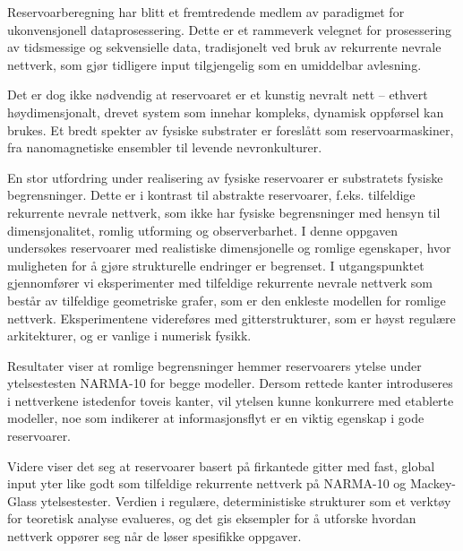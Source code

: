 Reservoarberegning har blitt et fremtredende medlem av paradigmet for
ukonvensjonell dataprosessering. Dette er et rammeverk velegnet for prosessering
av tidsmessige og sekvensielle data, tradisjonelt ved bruk av rekurrente nevrale
nettverk, som gjør tidligere input tilgjengelig som en umiddelbar avlesning.

Det er dog ikke nødvendig at reservoaret er et kunstig nevralt nett -- ethvert
høydimensjonalt, drevet system som innehar kompleks, dynamisk oppførsel kan
brukes. Et bredt spekter av fysiske substrater er foreslått som
reservoarmaskiner, fra nanomagnetiske ensembler til levende nevronkulturer.

En stor utfordring under realisering av fysiske reservoarer er substratets
fysiske begrensninger. Dette er i kontrast til abstrakte reservoarer,
f.eks. tilfeldige rekurrente nevrale nettverk, som ikke har fysiske
begrensninger med hensyn til dimensjonalitet, romlig utforming og
observerbarhet. I denne oppgaven undersøkes reservoarer med realistiske
dimensjonelle og romlige egenskaper, hvor muligheten for å gjøre strukturelle
endringer er begrenset. I utgangspunktet gjennomfører vi eksperimenter med
tilfeldige rekurrente nevrale nettverk som består av tilfeldige geometriske
grafer, som er den enkleste modellen for romlige nettverk. Eksperimentene
videreføres med gitterstrukturer, som er høyst regulære arkitekturer, og er
vanlige i numerisk fysikk.

Resultater viser at romlige begrensninger hemmer reservoarers ytelse under
ytelsestesten NARMA-10 for begge modeller. Dersom rettede kanter introduseres i
nettverkene istedenfor toveis kanter, vil ytelsen kunne konkurrere med etablerte
modeller, noe som indikerer at informasjonsflyt er en viktig egenskap i gode
reservoarer.

Videre viser det seg at reservoarer basert på firkantede gitter med fast, global
input yter like godt som tilfeldige rekurrente nettverk på NARMA-10 og
Mackey-Glass ytelsestester. Verdien i regulære, deterministiske strukturer som
et verktøy for teoretisk analyse evalueres, og det gis eksempler for å utforske
hvordan nettverk oppører seg når de løser spesifikke oppgaver.

